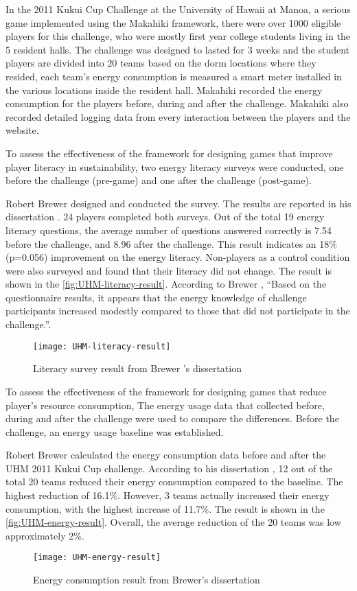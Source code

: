 In the 2011 Kukui Cup Challenge at the University of Hawaii at Manoa, a serious game implemented using the Makahiki framework, there were over 1000 eligible players for this challenge, who were mostly first
year college students living in the 5 resident halls. The challenge was designed to lasted for 3 weeks and the student players are divided into 20 teams based on the dorm locations where they resided, each team's energy consumption is measured a smart meter installed in the various locations inside the resident hall. Makahiki recorded the energy consumption for the players before, during and after the challenge. Makahiki also recorded detailed logging data from every interaction between the players and the website. 

To assess the effectiveness of the framework for designing games that improve player literacy in sustainability, 
 two energy literacy surveys were conducted, one before the challenge (pre-game) and one after
the challenge (post-game). 

Robert Brewer designed and conducted the survey. The results are reported in his dissertation \cite{csdl2-10-08}. 24 players completed both surveys. Out of the total 19 energy literacy questions, the average number of questions answered correctly is 7.54 before the
challenge, and 8.96 after the challenge. This result indicates an 18\% (p=0.056) improvement on the
energy literacy.  Non-players as a control condition were also surveyed and found that their literacy did not change. The result is shown in the \autoref{fig:UHM-literacy-result}. According to Brewer \cite{csdl2-10-08}, ``Based on the questionnaire results, it appears that the energy knowledge of challenge participants increased modestly compared to those that did not participate in the challenge.''.
\begin{figure}[ht!]
  \center
  \texttt{[image: UHM-literacy-result]}
  \caption{Literacy survey result from Brewer 's dissertation \cite{csdl2-10-08}}
  \label{fig:UHM-literacy-result}
\end{figure}

To assess the effectiveness of the framework for designing games that reduce player's resource consumption, The energy usage data that collected before, during and after the
challenge were used to compare the differences.  Before the challenge, an energy usage baseline was established. 

Robert Brewer calculated the energy consumption data before and after the UHM 2011 Kukui Cup challenge. According to his dissertation \cite{csdl2-10-08}, 12 out of the total 20 teams reduced their energy
consumption compared to the baseline. The highest reduction of 16.1\%. However, 3 teams actually increased
their energy consumption, with the highest increase of 11.7\%. The result is shown in the \autoref{fig:UHM-energy-result}. Overall, the average reduction of the 20 teams was low \- approximately 2\%.  
\begin{figure}[ht!]
  \center
  \texttt{[image: UHM-energy-result]}
  \caption{Energy consumption result from Brewer's dissertation \cite{csdl2-10-08}}
  \label{fig:UHM-energy-result}
\end{figure}

